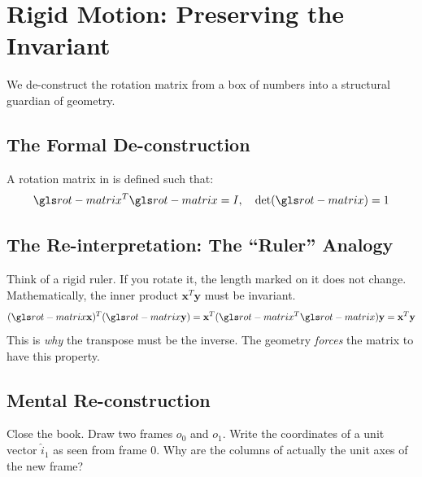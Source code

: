 \chapter{Rigid Motion: Preserving the Invariant}


\begin{chapteroverview}
    We de-construct the rotation matrix from a box of numbers into a structural guardian of geometry.
\end{chapteroverview}

\section{The Formal De-construction}
A rotation matrix  in  is defined such that:
\begin{equation}
    \sym{rot-matrix}^T \sym{rot-matrix} = I, \quad \det(\sym{rot-matrix}) = 1
\end{equation}

\section{The Re-interpretation: The ``Ruler'' Analogy}
\begin{intuitionbox}
    Think of a rigid ruler. If you rotate it, the length marked on it does not change. Mathematically, the inner product \(\mathbf{x}^T \mathbf{y}\) must be invariant.
    \begin{equation}
        (\sym{rot-matrix}\mathbf{x})^T (\sym{rot-matrix}\mathbf{y}) = \mathbf{x}^T (\sym{rot-matrix}^T \sym{rot-matrix}) \mathbf{y} = \mathbf{x}^T \mathbf{y}
    \end{equation}
    This is \textit{why} the transpose must be the inverse. The geometry \textit{forces} the matrix to have this property.
\end{intuitionbox}

\section{Mental Re-construction}
\begin{practice}
    Close the book. Draw two frames \(o_0\) and \(o_1\). Write the coordinates of a unit vector \(\hat{i}_1\) as seen from frame 0. Why are the columns of  actually the unit axes of the new frame?
\end{practice}

